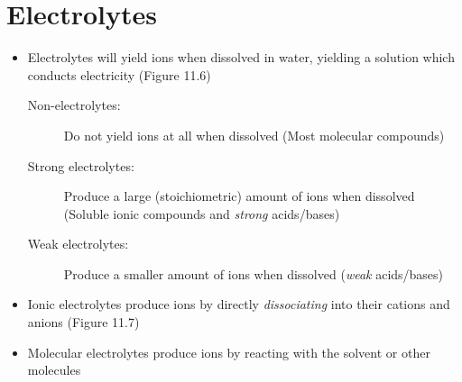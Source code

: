 \documentclass[12pt, openany, letterpaper]{memoir}
\begin{document}
\section{Electrolytes}
\begin{itemize}
  \item Electrolytes will yield ions when dissolved in water, yielding a solution which conducts electricity (Figure 11.6)
  \begin{description}
    \item[Non-electrolytes:] Do not yield ions at all when dissolved (Most molecular compounds)
    \item[Strong electrolytes:] Produce a large (stoichiometric) amount of ions when dissolved (Soluble ionic compounds and \emph{strong} acids/bases)
    \item[Weak electrolytes:] Produce a smaller amount of ions when dissolved (\emph{weak} acids/bases)
  \end{description}
  \item Ionic electrolytes produce ions by directly \emph{dissociating} into their cations and anions (Figure 11.7)
  \item Molecular electrolytes produce ions by reacting with the solvent or other molecules

\end{itemize}
\end{document}
